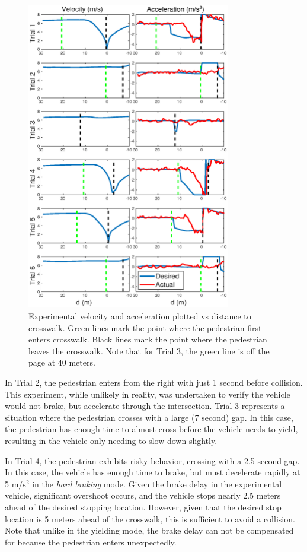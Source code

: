 \documentclass[letterpaper, 10 pt, conference]{ieeeconf}  %
\begin{document}
\begin{figure}[h]
\centering
\includegraphics[width=3.5in]{figures/expPlot.eps}
\caption{Experimental velocity and acceleration plotted vs distance to crosswalk. Green lines mark the point where the pedestrian first enters crosswalk. Black lines mark the point where the pedestrian leaves the crosswalk. Note that for Trial 3, the green line is off the page at 40 meters.}
\label{fig:expPlot}
\end{figure}

In Trial 2, the pedestrian enters from the right with just 1 second before collision. This experiment, while unlikely in reality, was undertaken to verify the vehicle would not brake, but accelerate through the intersection. Trial 3 represents a situation where the pedestrian crosses with a large (7 second) gap. In this case, the pedestrian has enough time to almost cross before the vehicle needs to yield, resulting in the vehicle only needing to slow down slightly. 

In Trial 4, the pedestrian exhibits risky behavior, crossing with a 2.5 second gap. In this case, the vehicle has enough time to brake, but must decelerate rapidly at 5 $\mathrm{m/s^2}$ in the \textit{hard braking} mode. Given the brake delay in the experimental vehicle, significant overshoot occurs, and the vehicle stops nearly 2.5 meters ahead of the desired stopping location. However, given that the desired stop location is 5 meters ahead of the crosswalk, this is sufficient to avoid a collision. Note that unlike in the yielding mode, the brake delay can not be compensated for because the pedestrian enters unexpectedly. 
\end{document}

